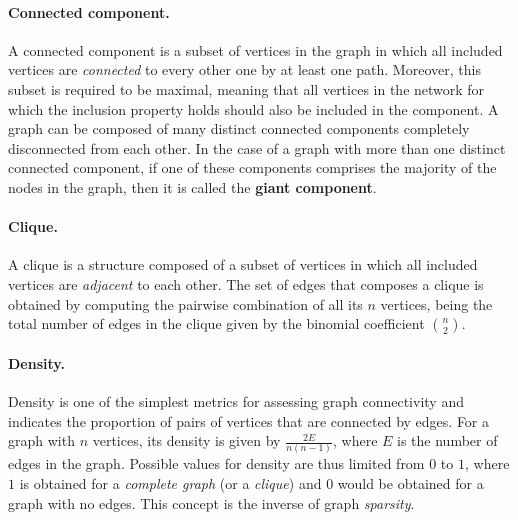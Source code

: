 \paragraph*{Connected component.}
A connected component is a subset of vertices in the graph in which all included vertices are \textit{connected} to every other one by at least one path.
Moreover, this subset is required to be maximal, meaning that all vertices in the network for which the inclusion property holds should also be included in the component. 
A graph can be composed of many distinct connected components completely disconnected from each other. In the case of a graph with more than one distinct connected component, if one of these components comprises the majority of the nodes in the graph, then it is called the \textbf{giant component}.

\paragraph*{Clique.}
A clique is a structure composed of a subset of vertices in which all included vertices are \textit{adjacent} to each other.
The set of edges that composes a clique is obtained by computing the pairwise combination of all its $n$ vertices, being the total number of edges in the clique given by the binomial coefficient $\binom{n}{2}$.

\paragraph*{Density.}
Density is one of the simplest metrics for assessing graph connectivity and indicates the proportion of pairs of vertices that are connected by edges.
For a graph with $n$ vertices, its density is given by $\frac{2E}{n(n-1)}$, where $E$ is the number of edges in the graph.
Possible values for density are thus limited from $0$ to $1$, where $1$ is obtained for a \textit{complete graph} (or a \textit{clique}) and $0$ would be obtained for a graph with no edges.
This concept is the inverse of graph \textit{sparsity}. 


